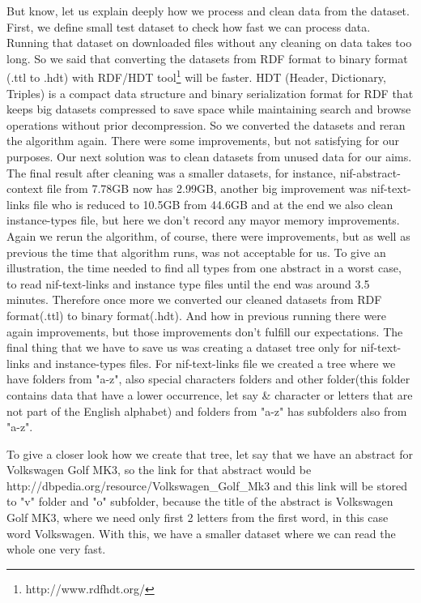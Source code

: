 \documentclass[thesis=M,english]{FITthesis}[2018/05/30]
\begin{document}
	But know, let us explain deeply how we process and clean data from the dataset. First, we define small test dataset to check how fast we can process data. Running that dataset on downloaded files without any cleaning on data takes too long. So we said that converting the datasets from RDF format to binary format (.ttl to .hdt) with RDF/HDT tool\footnote{http://www.rdfhdt.org/} will be faster. HDT (Header, Dictionary, Triples)\cite{FMPGPA:13} is a compact data structure and binary serialization format for RDF that keeps big datasets compressed to save space while maintaining search and browse operations without prior decompression. So we converted the datasets and reran the algorithm again. There were some improvements, but not satisfying for our purposes. Our next solution was to clean datasets from unused data for our aims. The final result after cleaning was a smaller datasets, for instance, nif-abstract-context file from 7.78GB now has 2.99GB, another big improvement was nif-text-links file who is reduced to 10.5GB from 44.6GB and at the end we also clean instance-types file, but here we don't record any mayor memory improvements. Again we rerun the algorithm, of course, there were improvements, but as well as previous the time that algorithm runs, was not acceptable for us. To give an illustration, the time needed to find all types from one abstract in a worst case, to read nif-text-links and instance type files until the end was around 3.5 minutes. Therefore once more we converted our cleaned datasets from RDF format(.ttl) to binary format(.hdt). And how in previous running there were again improvements, but those improvements don't fulfill our expectations. The final thing that we have to save us was creating a dataset tree only for nif-text-links and instance-types files. For nif-text-links file we created a tree where we have folders from "a-z", also special characters folders and other folder(this folder contains data that have a lower occurrence, let say \& character or letters that are not part of the English alphabet) and folders from "a-z" has subfolders also from "a-z". 

	To give a closer look how we create that tree, let say that we have an abstract for Volkswagen Golf MK3, so the link for that abstract would be http://dbpedia.org/resource/Volkswagen\_Golf\_Mk3 and this link will be stored to "v" folder and "o" subfolder, because the title of the abstract is Volkswagen Golf MK3, where we need only first 2 letters from the first word, in this case word Volkswagen. With this, we have a smaller dataset where we can read the whole one very fast.
\end{document}
